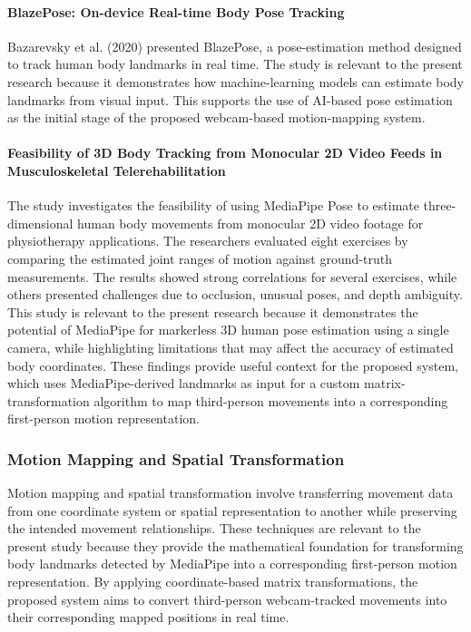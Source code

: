 \documentclass[12pt,a4paper]{article}
\begin{document}
        \paragraph{BlazePose: On-device Real-time Body Pose Tracking}
        Bazarevsky et al. (2020) presented BlazePose, a pose-estimation method designed to track human body landmarks in real time. The study is relevant to the present research because it demonstrates how machine-learning models can estimate body landmarks from visual input. This supports the use of AI-based pose estimation as the initial stage of the proposed webcam-based motion-mapping system.
        
        \paragraph{Feasibility of 3D Body Tracking from Monocular 2D Video Feeds in Musculoskeletal Telerehabilitation}
        The study investigates the feasibility of using MediaPipe Pose to estimate three-dimensional human body movements from monocular 2D video footage for physiotherapy applications. The researchers evaluated eight exercises by comparing the estimated joint ranges of motion against ground-truth measurements. The results showed strong correlations for several exercises, while others presented challenges due to occlusion, unusual poses, and depth ambiguity. This study is relevant to the present research because it demonstrates the potential of MediaPipe for markerless 3D human pose estimation using a single camera, while highlighting limitations that may affect the accuracy of estimated body coordinates. These findings provide useful context for the proposed system, which uses MediaPipe-derived landmarks as input for a custom matrix-transformation algorithm to map third-person movements into a corresponding first-person motion representation.

    \subsubsection{Motion Mapping and Spatial Transformation}
    Motion mapping and spatial transformation involve transferring movement data from one coordinate system or spatial representation to another while preserving the intended movement relationships. These techniques are relevant to the present study because they provide the mathematical foundation for transforming body landmarks detected by MediaPipe into a corresponding first-person motion representation. By applying coordinate-based matrix transformations, the proposed system aims to convert third-person webcam-tracked movements into their corresponding mapped positions in real time.
\end{document}
